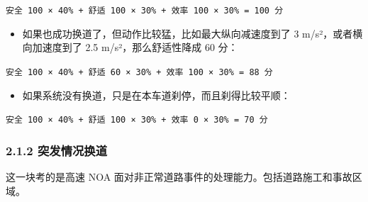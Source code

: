 \texttt{安全 100 × 40\% + 舒适 100 × 30\% + 效率 100 × 30\% = 100 分}

\begin{itemize}
  \item 如果也成功换道了，但动作比较猛，比如最大纵向减速度到了 3 m/s²，或者横向加速度到了 2.5 m/s²，那么舒适性降成 60 分：
\end{itemize}

\texttt{安全 100 × 40\% + 舒适 60 × 30\% + 效率 100 × 30\% = 88 分}

\begin{itemize}
  \item 如果系统没有换道，只是在本车道刹停，而且刹得比较平顺：
\end{itemize}

\texttt{安全 100 × 40\% + 舒适 100 × 30\% + 效率 0 × 30\% = 70 分}

\subsubsection{2.1.2 突发情况换道}

这一块考的是高速 NOA 面对非正常道路事件的处理能力。包括道路施工和事故区域。

